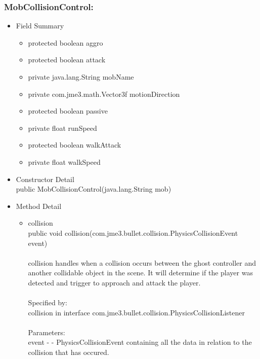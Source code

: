 \documentclass[letterpaper]{article}
\begin{document}
				\vspace{0.2in}
				\subsubsection*{MobCollisionControl:}
				\vspace{0.1in}	
					\begin{itemize}
						\item	Field Summary
								\begin{itemize}
									\item	protected boolean	aggro 
									\item	protected boolean	attack 
									\item	private java.lang.String	mobName 
									\item	private com.jme3.math.Vector3f	motionDirection 
									\item	protected boolean	passive 
									\item	private float	runSpeed 
									\item	protected boolean	walkAttack 
									\item	private float	walkSpeed 
								\end{itemize}
						\item	Constructor Detail \\
								public MobCollisionControl(java.lang.String mob)
						\item	Method Detail
								\begin{itemize}
									\item	collision \\
											public void collision(com.jme3.bullet.collision.PhysicsCollisionEvent event) \\ \\
											collision handles when a collision occurs between the ghost controller and another collidable object in the scene. It will determine if the player was detected and trigger to approach and attack the player. \\ \\
											Specified by: \\
											collision in interface com.jme3.bullet.collision.PhysicsCollisionListener \\ \\
											Parameters: \\
											event - - PhysicsCollisionEvent containing all the data in relation to the collision that has occured.

\end{itemize}
\end{itemize}
\end{document}
